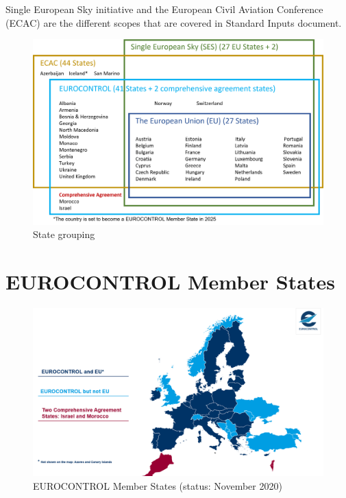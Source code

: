 \documentclass[
  11pt,
  a4paper,
]{book}
\begin{document}

Single European Sky initiative and the European Civil Aviation
Conference (ECAC) are the different scopes that are covered in Standard
Inputs document.

\begin{figure}

{\centering \includegraphics{chapters/../figures/eu_orgs.png}

}

\caption{\label{fig-member-states-set-diagram}State grouping}

\end{figure}

\hypertarget{eurocontrol-member-states}{%
\section*{EUROCONTROL Member States}\label{eurocontrol-member-states}}


\begin{figure}

{\centering \includegraphics{chapters/../figures/eurocontrol_ms.png}

}

\caption{\label{fig-eurocontrol-member-states}EUROCONTROL Member States
(status: November 2020)}

\end{figure}
\end{document}
